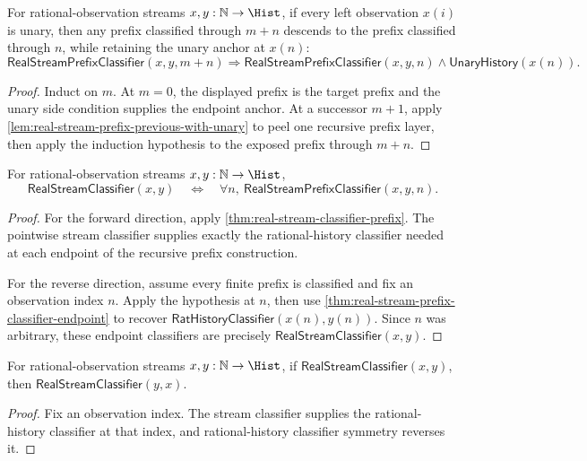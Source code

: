 \begin{theorem}
\label{thm:real-stream-prefix-add-left-previous-with-unary}
For rational-observation streams \(x,y:\mathbb{N}\to\Hist\), if every left observation \(x(i)\) is unary, then any prefix classified through \(m+n\) descends to the prefix classified through \(n\), while retaining the unary anchor at \(x(n)\):
$$
\mathsf{RealStreamPrefixClassifier}(x,y,m+n)
\Longrightarrow
\mathsf{RealStreamPrefixClassifier}(x,y,n)\wedge \mathsf{UnaryHistory}(x(n)).
$$
\end{theorem}
\begin{proof}
Induct on \(m\). At \(m=0\), the displayed prefix is the target prefix and the unary side condition supplies the endpoint anchor. At a successor \(m+1\), apply \autoref{lem:real-stream-prefix-previous-with-unary} to peel one recursive prefix layer, then apply the induction hypothesis to the exposed prefix through \(m+n\).
\end{proof}

\begin{theorem}
\label{thm:real-stream-finite-prefix-exactness}
For rational-observation streams $x,y:\mathbb{N}\to\Hist$,
$$
\mathsf{RealStreamClassifier}(x,y)
\quad\Longleftrightarrow\quad
\forall n,\ \mathsf{RealStreamPrefixClassifier}(x,y,n).
$$
\end{theorem}
\begin{proof}
For the forward direction, apply
\autoref{thm:real-stream-classifier-prefix}. The pointwise stream classifier
supplies exactly the rational-history classifier needed at each endpoint of the
recursive prefix construction.

For the reverse direction, assume every finite prefix is classified and fix an
observation index $n$. Apply the hypothesis at $n$, then use
\autoref{thm:real-stream-prefix-classifier-endpoint} to recover
$\mathsf{RatHistoryClassifier}(x(n),y(n))$. Since $n$ was arbitrary, these
endpoint classifiers are precisely $\mathsf{RealStreamClassifier}(x,y)$.
\end{proof}

\begin{theorem}
\label{thm:real-stream-classifier-symmetry}
For rational-observation streams $x,y:\mathbb{N}\to\Hist$, if
$\mathsf{RealStreamClassifier}(x,y)$, then
$\mathsf{RealStreamClassifier}(y,x)$.
\end{theorem}
\begin{proof}
Fix an observation index. The stream classifier supplies the rational-history
classifier at that index, and rational-history classifier symmetry reverses it.
\end{proof}

